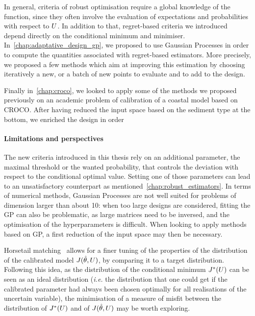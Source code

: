 \documentclass[../../Main_ManuscritThese.tex]{subfiles}
\begin{document}
In general, criteria of robust optimisation require a global
knowledge of the function, since they often involve the evaluation of
expectations and probabilities with respect to $U$. In addition to
that, regret-based criteria we introduced depend directly on the
conditional minimum and minimiser. In~\cref{chap:adaptative_design_gp},
we proposed to use Gaussian Processes in order to compute the
quantities associated with regret-based estimators. More precisely, we
proposed a few methods which aim at improving this estimation by
choosing iteratively a new, or a batch of new points to evaluate and
to add to the design.

Finally in~\cref{chap:croco}, we looked to apply some of the methods
we proposed previously on an academic problem of calibration of a
coastal model based on CROCO. After having reduced the input space
based on the sediment type at the bottom, we enriched the design in order 

\paragraph{Limitations and perspectives}
The new criteria introduced in this thesis rely on an additional
parameter, the maximal threshold or the wanted probability, that
controls the deviation with respect to the conditional optimal
value. Setting one of those parameters can lead to an unsatisfactory
counterpart as mentioned~\cref{chap:robust_estimators}. In terms of
numerical methods, Gaussian Processes are not well suited for problems
of dimension larger than about \num{10}: when too large designs are
considered, fitting the GP can also be problematic, as large matrices
need to be inversed, and the optimisation of the hyperparameters is
difficult.  When looking to apply methods based on GP, a first
reduction of the input space may then be necessary.

Horsetail matching~\cite{cook_extending_2017,cook_horsetail_2018}
allows for a finer tuning of the properties of the distribution of the
calibrated model $J(\hat{\theta},U)$, by comparing it to a target
distribution. Following this idea, as the distribution of the
conditional minimum $J^*(U)$ can be seen as an ideal distribution
(\emph{i.e.} the distribution that one could get if the calibrated
parameter had always been chosen optimally for all realisations of the
uncertain variable), the minimisation of a measure of misfit between
the distribution of $J^*(U)$ and of $J(\hat{\theta},U)$ may be worth
exploring.


\clearpage
\subfileLocal{
	\pagestyle{empty}
	
        
}

\end{document}

